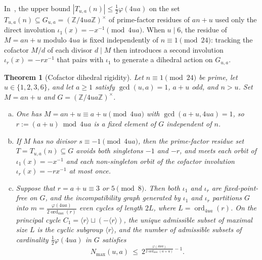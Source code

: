 \documentclass[11pt, a4paper]{article}
\theoremstyle{plain}
\newtheorem{theorem}{Theorem}[section]
\theoremstyle{definition}
\newcommand{\Z}{\mathbb{Z}}
\begin{document}
In~\cite[Lemma~4.2]{dahan2026a}, the upper bound $|T_{u,a}(n)|\le\frac12\varphi(4ua)$ on the set $T_{u,a}(n)\subseteq G_{u,a}=(\Z/4ua\Z)^{\times}$ of prime-factor residues of $an+u$ used only the direct involution $\iota_1(x)=-x^{-1}\pmod{4ua}$. When $u\mid 6$, the residue of $M=an+u$ modulo $4ua$ is fixed independently of $n\equiv1\pmod{24}$: tracking the cofactor $M/d$ of each divisor $d\mid M$ then introduces a second involution $\iota_r(x)=-rx^{-1}$ that pairs with $\iota_1$ to generate a dihedral action on $G_{u,a}$.

\begin{theorem}[Cofactor dihedral rigidity]\label{thm:dihedral_rigidity}
Let $n\equiv1\pmod{24}$ be prime, let $u\in\{1,2,3,6\}$, and let $a\ge1$ satisfy $\gcd(u,a)=1$, $a+u$ odd, and $n>u$. Set $M=an+u$ and $G=(\Z/4ua\Z)^{\times}$.
\begin{enumerate}[(a)]
    \item One has $M=an+u\equiv a+u\pmod{4ua}$ with $\gcd(a+u,4ua)=1$, so $r:=(a+u)\bmod 4ua$ is a fixed element of $G$ independent of $n$.
    \item If $M$ has no divisor $s\equiv-1\pmod{4ua}$, then the prime-factor residue set $T=T_{u,a}(n)\subseteq G$ avoids both singletons $-1$ and $-r$, and meets each orbit of $\iota_1(x)=-x^{-1}$ and each non-singleton orbit of the cofactor involution $\iota_r(x)=-rx^{-1}$ at most once.
    \item Suppose that $r=a+u\equiv3$ or $5\pmod 8$. Then both $\iota_1$ and $\iota_r$ are fixed-point-free on $G$, and the incompatibility graph generated by $\iota_1$ and $\iota_r$ partitions $G$ into $m=\frac{\varphi(4ua)}{2\operatorname{ord}_{4ua}(r)}$ even cycles of length $2L$, where $L=\operatorname{ord}_{4ua}(r)$. On the principal cycle $C_1=\langle r\rangle\sqcup(-\langle r\rangle)$, the unique admissible subset of maximal size $L$ is the cyclic subgroup $\langle r\rangle$, and the number of admissible subsets of cardinality $\frac12\varphi(4ua)$ in $G$ satisfies
    \begin{equation}\label{eq:dihedral_Nmax}
    N_{\max}(u,a)\ \le\ 2^{\frac{\varphi(4ua)}{2\operatorname{ord}_{4ua}(a+u)}-1}.
    \end{equation}
\end{enumerate}
\end{theorem}
\end{document}
